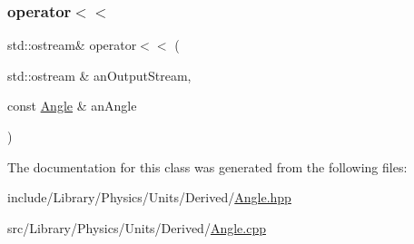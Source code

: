 \subsubsection{\texorpdfstring{operator$<$$<$}{operator<<}}
{\footnotesize\ttfamily std\+::ostream\& operator$<$$<$ (\begin{DoxyParamCaption}\item[{std\+::ostream \&}]{an\+Output\+Stream,  }\item[{const \hyperlink{classlibrary_1_1physics_1_1units_1_1_angle}{Angle} \&}]{an\+Angle }\end{DoxyParamCaption})\hspace{0.3cm}{\ttfamily [friend]}}



The documentation for this class was generated from the following files\+:\begin{DoxyCompactItemize}
\item 
include/\+Library/\+Physics/\+Units/\+Derived/\hyperlink{_angle_8hpp}{Angle.\+hpp}\item 
src/\+Library/\+Physics/\+Units/\+Derived/\hyperlink{_angle_8cpp}{Angle.\+cpp}\end{DoxyCompactItemize}
